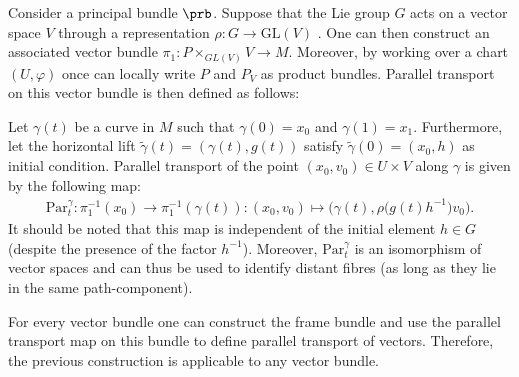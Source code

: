 
    \begin{example}
        Consider a principal bundle $\prb$. Suppose that the Lie group $G$ acts on a vector space $V$ through a representation $\rho:G\rightarrow\text{GL}(V)$ . One can then construct an associated vector bundle $\pi_1:P\times_{GL(V)} V\rightarrow M$. Moreover, by working over a chart $(U, \varphi)$ once can locally write $P$ and $P_V$ as product bundles. Parallel transport on this vector bundle is then defined as follows:

        \qquad Let $\gamma(t)$ be a curve in $M$ such that $\gamma(0)=x_0$ and $\gamma(1) = x_1$. Furthermore, let the horizontal lift $\widetilde{\gamma}(t) = (\gamma(t), g(t))$ satisfy $\widetilde{\gamma}(0)=(x_0, h)$ as initial condition. Parallel transport of the point $(x_0, v_0)\in U\times V$ along $\gamma$ is given by the following map:
        \begin{gather}
            \text{Par}^\gamma_t:\pi^{-1}_1(x_0)\rightarrow\pi^{-1}_1(\gamma(t)):(x_0, v_0)\mapsto \big(\gamma(t), \rho\big(g(t)h^{-1}\big)v_0\big).
        \end{gather}
        It should be noted that this map is independent of the initial element $h\in G$ (despite the presence of the factor $h^{-1}$). Moreover, $\text{Par}^\gamma_t$ is an isomorphism of vector spaces and can thus be used to identify distant fibres (as long as they lie in the same path-component).
    \end{example}
    \begin{remark}
        For every vector bundle one can construct the frame bundle and use the parallel transport map on this bundle to define parallel transport of vectors. Therefore, the previous construction is applicable to any vector bundle.
    \end{remark}

